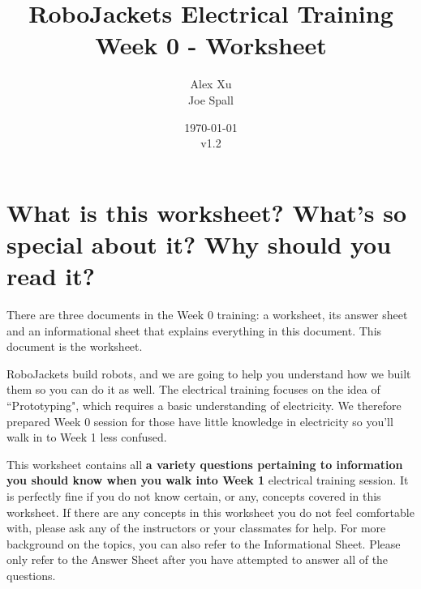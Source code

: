 \documentclass{article}
\title{RoboJackets Electrical Training Week 0 - Worksheet}
\author{Alex Xu \\ Joe Spall}
\date{\today\\v1.2}
\begin{document}
\maketitle{}
\setcounter{tocdepth}{2}
\tableofcontents
\pagebreak

\section{What is this worksheet? What's so special about it? Why should you read it?}
There are three documents in the Week 0 training: a worksheet, its answer sheet and an informational sheet that explains everything in this document. This document is the worksheet.
\vspace{6pt}\par
RoboJackets build robots, and we are going to help you understand how we built them so you can do it as well. The electrical training focuses on the idea of ``Prototyping", which requires a basic understanding of electricity. We therefore prepared Week 0 session for those have little knowledge in electricity so you'll walk in to Week 1 less confused. \vspace{6pt}\par
This worksheet contains all \textbf{a variety questions pertaining to information you should know when you walk into Week 1} electrical training session. It is perfectly fine if you do not know certain, or any, concepts covered in this worksheet. If there are any concepts in this worksheet you do not feel comfortable with, please ask any of the instructors or your classmates for help. For more background on the topics, you can also refer to the Informational Sheet. Please only refer to the Answer Sheet after you have attempted to answer all of the questions.\vspace{6pt}\par
\end{document}
